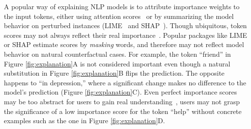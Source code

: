 



A popular way of explaining NLP models is to attribute importance weights to the input tokens, either using attention scores~\cite{wiegreffe2019attention} or by summarizing the model behavior on perturbed instances (\eg LIME~\cite{Ribeiro2016WhySI} and SHAP~\cite{NIPS2017_7062}).
Though ubiquitous, token scores may not always reflect their real importance~\cite{pruthi2020learning}.
Popular packages like LIME or SHAP estimate scores by \emph{masking} words, and therefore may not reflect model behavior on natural counterfactual cases. For example, the token ``friend'' in Figure \ref{fig:explanation}A is not considered important even though a natural substitution in Figure \ref{fig:explanation}B flips the prediction. The opposite happens to ``in depression,'' where a significant change makes no difference to the model's prediction (Figure \ref{fig:explanation}C).
Even perfect importance scores may be too abstract for users to gain real understanding~\cite{miller}, \eg users may not grasp the significance of a low importance score for the token ``help'' without concrete examples such as the one in Figure \ref{fig:explanation}D. 




